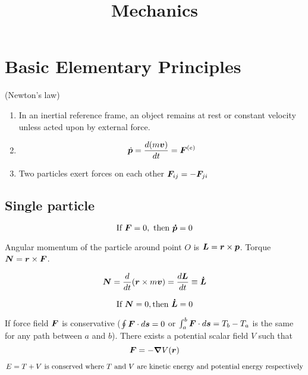 \documentclass[12pt]{article}
\title{Mechanics}
\begin{document}
	\maketitle
	
\section{Basic Elementary Principles}
\begin{theorem}(Newton's law)
	\begin{enumerate}
		\item  \textnormal{In an inertial reference frame, an object remains at rest or constant velocity unless acted upon by external force.}
		\item  $$\dot{\boldsymbol{p}} = \frac{d(m\boldsymbol{v})}{dt} = \boldsymbol{F}^{(e)}$$
		\item  \textnormal{Two particles exert forces on each other } $\boldsymbol{F}_{ij} = -\boldsymbol{F}_{ji}$
	\end{enumerate}
\end{theorem}
\subsection{Single particle}

 \begin{theorem}
 	$$\text{If } \boldsymbol{F} = 0, \text{ then } \boldsymbol{\dot p} = 0$$
 \end{theorem}

Angular momentum of the particle around point $O$ is $\boldsymbol{L} = \boldsymbol{r} \times \boldsymbol{p}$. Torque $\boldsymbol{N} = \boldsymbol{r} \times \boldsymbol{F}$. 

$$ \boldsymbol{N} = \frac{d}{dt} (\boldsymbol{r} \times m\boldsymbol{v}) = \frac{d \boldsymbol{L}}{dt} \equiv \boldsymbol{\dot L}$$

\begin{theorem}
	$$\textnormal{If } \boldsymbol{N} = 0,  \textnormal{then } \boldsymbol{\dot L} = 0$$
\end{theorem}

If force field $\boldsymbol{F}$ is conservative ($\oint \boldsymbol{F} \cdot d \boldsymbol{s} = 0$ or $\int_a^b \boldsymbol{F} \cdot d\boldsymbol{s} = T_b - T_a$ is the same for any path between $a$ and $b$). 
There exists a potential scalar field $V$ such that $$\boldsymbol{F} = -\grad{V(\boldsymbol{r})}$$

\begin{theorem}
	 $$E = T + V \textnormal{ is conserved where } T \textnormal{ and } V \textnormal{ are kinetic energy and potential energy respectively}$$
\end{theorem}
\end{document}
